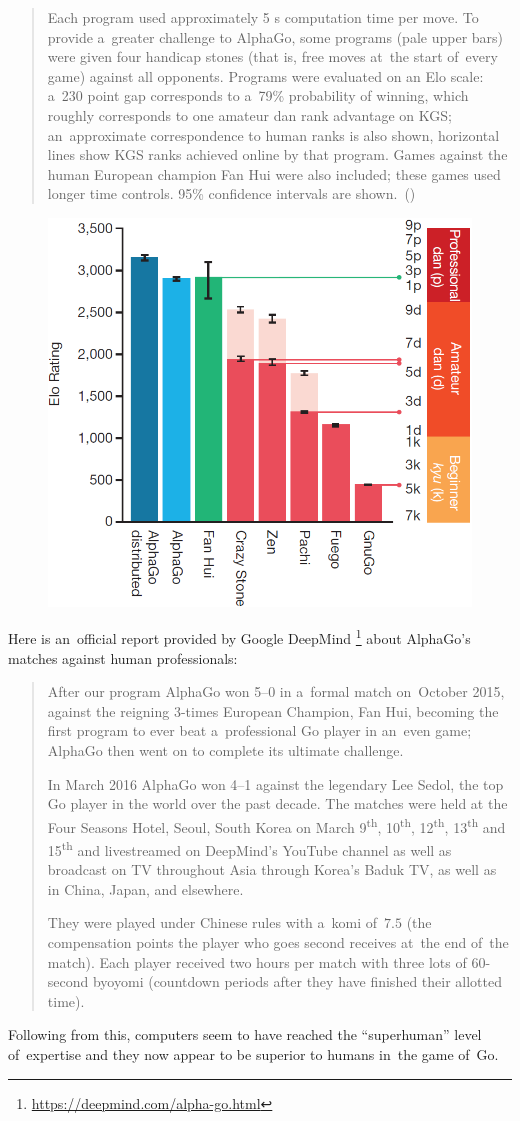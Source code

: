 \begin{quotation} \noindent
  Each program used approximately 5 s computation time per move.
  To provide a~greater challenge to AlphaGo, some programs (pale upper bars) were given four handicap stones (that is, free moves at~the start of~every game) against all opponents.
  Programs were evaluated on an Elo scale: a~230 point gap corresponds to a~79\% probability of winning, which roughly corresponds to one amateur dan rank advantage on KGS;
  an~approximate correspondence to human ranks is also shown, horizontal lines show KGS ranks achieved online by that program.
  Games against the human European champion Fan Hui were also included;
  these games used longer time controls.
  95\% confidence intervals are shown.~(\cite{Silver2016mastering})
\end{quotation}

\begin{figure}[H]
  \centering
  \includegraphics[width=.5\textwidth]{../img/results_of_tournament.png}
  \label{fig:Go-tournament}
\end{figure}

Here is an~official report provided by Google DeepMind%
\footnote{\href{https://deepmind.com/alpha-go.html}{https://deepmind.com/alpha-go.html}}
about AlphaGo's matches against human professionals:
\begin{quotation} \noindent
  After our program AlphaGo won 5--0 in a~formal match on~October 2015, against the reigning 3-times European Champion, Fan Hui, becoming the first program to ever beat a~professional Go player in an~even game;
  AlphaGo then went on to complete its ultimate challenge.

  In March 2016 AlphaGo won 4--1 against the legendary Lee Sedol, the top Go player in the world over the past decade.
  The matches were held at the Four Seasons Hotel, Seoul, South Korea on March 9\textsuperscript{th}, 10\textsuperscript{th}, 12\textsuperscript{th}, 13\textsuperscript{th} and 15\textsuperscript{th} and livestreamed on DeepMind’s YouTube channel as well as broadcast on TV throughout Asia through Korea’s Baduk TV, as well as in China, Japan, and elsewhere.

  They were played under Chinese rules with a~komi of~$7.5$ (the compensation points the player who goes second receives at~the end of~the match).
  Each player received two hours per match with three lots of 60-second byoyomi (countdown periods after they have finished their allotted time).
\end{quotation}

Following from this, computers seem to have reached the ``superhuman'' level of~expertise and they now appear to be superior to humans in~the game of~Go.
